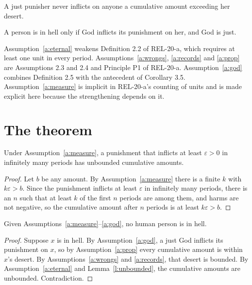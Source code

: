 \documentclass{situationist-preprint}
\begin{document}
\begin{assumption}[Proportionality]\label{a:prop}
A just punisher never inflicts on anyone a cumulative amount exceeding her desert.
\end{assumption}

\begin{assumption}\label{a:god}
A person is in hell only if God inflicts its punishment on her, and God is just.
\end{assumption}

Assumption~\ref{a:eternal} weakens Definition 2.2 of REL-20-a, which requires at least one unit in every period. Assumptions~\ref{a:wrongs}, \ref{a:records} and \ref{a:prop} are Assumptions 2.3 and 2.4 and Principle P1 of REL-20-a. Assumption~\ref{a:god} combines Definition 2.5 with the antecedent of Corollary 3.5. Assumption~\ref{a:measure} is implicit in REL-20-a's counting of units and is made explicit here because the strengthening depends on it.

\section{The theorem}

\begin{lemma}\label{l:unbounded}
Under Assumption~\ref{a:measure}, a punishment that inflicts at least $\varepsilon > 0$ in infinitely many periods has unbounded cumulative amounts.
\end{lemma}

\begin{proof}
Let $b$ be any amount. By Assumption~\ref{a:measure} there is a finite $k$ with $k\varepsilon > b$. Since the punishment inflicts at least $\varepsilon$ in infinitely many periods, there is an $n$ such that at least $k$ of the first $n$ periods are among them, and harms are not negative, so the cumulative amount after $n$ periods is at least $k\varepsilon > b$.
\end{proof}

\begin{theorem}\label{t:empty}
Given Assumptions~\ref{a:measure}--\ref{a:god}, no human person is in hell.
\end{theorem}

\begin{proof}
Suppose $x$ is in hell. By Assumption~\ref{a:god}, a just God inflicts its punishment on $x$, so by Assumption~\ref{a:prop} every cumulative amount is within $x$'s desert. By Assumptions~\ref{a:wrongs} and \ref{a:records}, that desert is bounded. By Assumption~\ref{a:eternal} and Lemma~\ref{l:unbounded}, the cumulative amounts are unbounded. Contradiction.
\end{proof}
\end{document}
